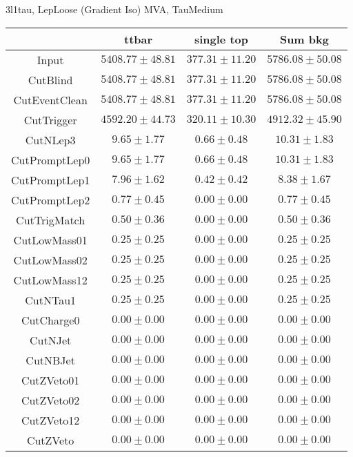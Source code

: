 \documentclass[11pt]{article}
\begin{document}
3l1tau, LepLoose (Gradient Iso) MVA, TauMedium\\
\begin{tabular}{|c|c|c|c|}
\hline
              & ttbar               & single top         & Sum bkg            \\
\hline
Input         & $5408.77 \pm 48.81$ & $377.31 \pm 11.20$ & $5786.08 \pm 50.08$\\
CutBlind      & $5408.77 \pm 48.81$ & $377.31 \pm 11.20$ & $5786.08 \pm 50.08$\\
CutEventClean & $5408.77 \pm 48.81$ & $377.31 \pm 11.20$ & $5786.08 \pm 50.08$\\
CutTrigger    & $4592.20 \pm 44.73$ & $320.11 \pm 10.30$ & $4912.32 \pm 45.90$\\
CutNLep3      &     $9.65 \pm 1.77$ &    $0.66 \pm 0.48$ &    $10.31 \pm 1.83$\\
CutPromptLep0 &     $9.65 \pm 1.77$ &    $0.66 \pm 0.48$ &    $10.31 \pm 1.83$\\
CutPromptLep1 &     $7.96 \pm 1.62$ &    $0.42 \pm 0.42$ &     $8.38 \pm 1.67$\\
CutPromptLep2 &     $0.77 \pm 0.45$ &    $0.00 \pm 0.00$ &     $0.77 \pm 0.45$\\
CutTrigMatch  &     $0.50 \pm 0.36$ &    $0.00 \pm 0.00$ &     $0.50 \pm 0.36$\\
CutLowMass01  &     $0.25 \pm 0.25$ &    $0.00 \pm 0.00$ &     $0.25 \pm 0.25$\\
CutLowMass02  &     $0.25 \pm 0.25$ &    $0.00 \pm 0.00$ &     $0.25 \pm 0.25$\\
CutLowMass12  &     $0.25 \pm 0.25$ &    $0.00 \pm 0.00$ &     $0.25 \pm 0.25$\\
CutNTau1      &     $0.25 \pm 0.25$ &    $0.00 \pm 0.00$ &     $0.25 \pm 0.25$\\
CutCharge0    &     $0.00 \pm 0.00$ &    $0.00 \pm 0.00$ &     $0.00 \pm 0.00$\\
CutNJet       &     $0.00 \pm 0.00$ &    $0.00 \pm 0.00$ &     $0.00 \pm 0.00$\\
CutNBJet      &     $0.00 \pm 0.00$ &    $0.00 \pm 0.00$ &     $0.00 \pm 0.00$\\
CutZVeto01    &     $0.00 \pm 0.00$ &    $0.00 \pm 0.00$ &     $0.00 \pm 0.00$\\
CutZVeto02    &     $0.00 \pm 0.00$ &    $0.00 \pm 0.00$ &     $0.00 \pm 0.00$\\
CutZVeto12    &     $0.00 \pm 0.00$ &    $0.00 \pm 0.00$ &     $0.00 \pm 0.00$\\
CutZVeto      &     $0.00 \pm 0.00$ &    $0.00 \pm 0.00$ &     $0.00 \pm 0.00$\\
\hline
\end{tabular}
\end{document}

